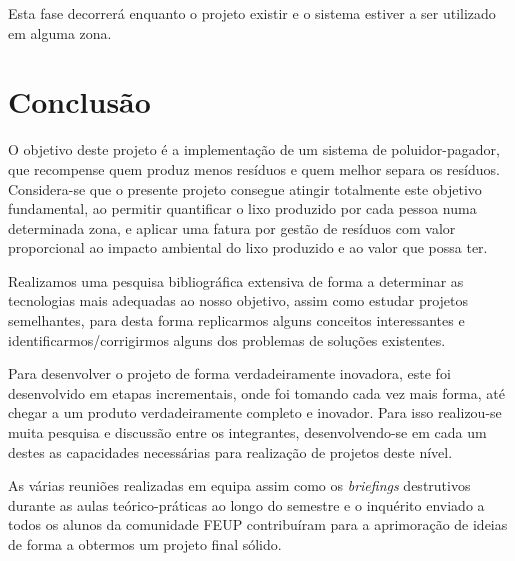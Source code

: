 \documentclass[11pt, a4paper, oneside]{book}
\begin{document}
Esta fase decorrerá enquanto o projeto existir e o sistema estiver a ser utilizado em alguma zona.

\chapter{Conclusão}

O objetivo deste projeto é a implementação de um sistema de poluidor-pagador, que recompense quem produz menos resíduos e quem melhor separa os resíduos. Considera-se que o presente projeto consegue atingir totalmente este objetivo fundamental, ao permitir quantificar o lixo produzido por cada pessoa numa determinada zona, e aplicar uma fatura por gestão de resíduos com valor proporcional ao impacto ambiental do lixo produzido e ao valor que possa ter.

Realizamos uma pesquisa bibliográfica extensiva de forma a determinar as tecnologias mais adequadas ao nosso objetivo, assim como estudar projetos semelhantes, para desta forma replicarmos alguns conceitos interessantes e identificarmos/corrigirmos alguns dos problemas de soluções existentes.

Para desenvolver o projeto de forma verdadeiramente inovadora, este foi desenvolvido em etapas incrementais, onde foi tomando cada vez mais forma, até chegar a um produto verdadeiramente completo e inovador. Para isso realizou-se muita pesquisa e discussão entre os integrantes, desenvolvendo-se em cada um destes as capacidades necessárias para realização de projetos deste nível.

As várias reuniões realizadas em equipa assim como os \textit{briefings} destrutivos durante as aulas teórico-práticas ao longo do semestre e o inquérito enviado a todos os alunos da comunidade FEUP contribuíram para a aprimoração de ideias de forma a obtermos um projeto final sólido.

\nocite{*}

\clearpage
{}



\end{document}
